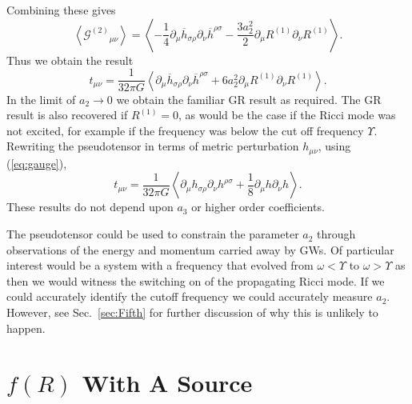 \documentclass[aps,prd,amsfonts,amssymb,amsmath,nofootinbib,reprint,showpacs]{revtex4-1}
\newcommand{\eqnref}[1]{(\ref{eq:#1})}
\newcommand{\secref}[1]{Sec.\ \ref{sec:#1}}
\newcommand{\recip}[1]{\ensuremath{\frac{1}{#1}}}
\begin{document}
Combining these gives
\begin{equation}
\left\langle {\mathcal{G}^{(2)}}_{\mu\nu}\right\rangle = \left\langle -\recip{4} \partial_\mu\overline{h}_{\sigma\rho}\partial_\nu\overline{h}^{\rho\sigma} - \frac{3a_2^2}{2}\partial_\mu R^{(1)}\partial_\nu R^{(1)} \right\rangle.
\end{equation}
Thus we obtain the result
\begin{equation}
t_{\mu\nu} = \recip{32\pi G}\left\langle \partial_\mu\overline{h}_{\sigma\rho}\partial_\nu\overline{h}^{\rho\sigma} + 6a_2^2\partial_\mu R^{(1)}\partial_\nu R^{(1)} \right\rangle.
\label{eq:Pseudotensor}
\end{equation}
In the limit of $a_2 \rightarrow 0$ we obtain the familiar GR result as required. The GR result is also recovered if $R^{(1)} = 0$, as would be the case if the Ricci mode was not excited, for example if the frequency was below the cut off frequency $\Upsilon$. Rewriting the pseudotensor in terms of metric perturbation $h_{\mu\nu}$, using \eqnref{gauge},
\begin{equation}
t_{\mu\nu} = \recip{32\pi G}\left\langle \partial_\mu h_{\sigma\rho}\partial_\nu h^{\rho\sigma} + \recip{8}\partial_\mu h \partial_\nu h \right\rangle.
\end{equation}
These results do not depend upon $a_3$ or higher order coefficients.

The pseudotensor could be used to constrain the parameter $a_2$ through observations of the energy and momentum carried away by GWs. Of particular interest would be a system with a frequency that evolved from $\omega < \Upsilon$ to $\omega > \Upsilon$ as then we would witness the switching on of the propagating Ricci mode. If we could accurately identify the cutoff frequency we could accurately measure $a_2$. However, see \secref{Fifth} for further discussion of why this is unlikely to happen.

\section{$f(R)$ With A Source\label{sec:Source}}
\end{document}
